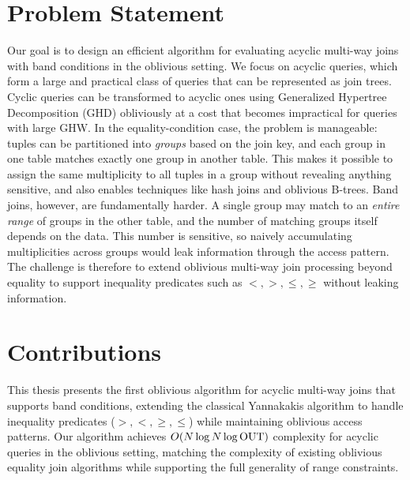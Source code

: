 \section{Problem Statement}

Our goal is to design an efficient algorithm for evaluating acyclic multi-way joins with band conditions in the oblivious setting. We focus on acyclic queries, which form a large and practical class of queries that can be represented as join trees. Cyclic queries can be transformed to acyclic ones using Generalized Hypertree Decomposition (GHD) obliviously at a cost that becomes impractical for queries with large GHW. In the equality-condition case, the problem is manageable: tuples can be partitioned into \emph{groups} based on the join key, and each group in one table matches exactly one group in another table. This makes it possible to assign the same multiplicity to all tuples in a group without revealing anything sensitive, and also enables techniques like hash joins and oblivious B-trees. Band joins, however, are fundamentally harder. A single group may match to an \emph{entire range} of groups in the other table, and the number of matching groups itself depends on the data. This number is sensitive, so naively accumulating multiplicities across groups would leak information through the access pattern. The challenge is therefore to extend oblivious multi-way join processing beyond equality to support inequality predicates such as $<, >, \leq, \geq$ without leaking information.

\section{Contributions}

This thesis presents the first oblivious algorithm for acyclic multi-way joins that supports band conditions, extending the classical Yannakakis algorithm to handle inequality predicates ($>, <, \geq, \leq$) while maintaining oblivious access patterns. Our algorithm achieves $O(N \log N \log \text{OUT})$ complexity for acyclic queries in the oblivious setting, matching the complexity of existing oblivious equality join algorithms while supporting the full generality of range constraints.

